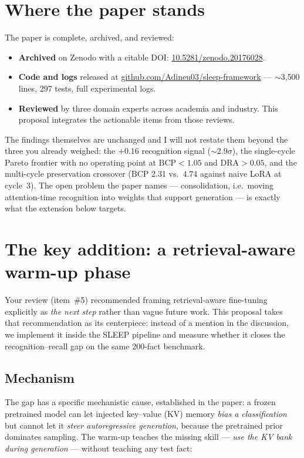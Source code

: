 \documentclass[11pt]{article}
\begin{document}
\section{Where the paper stands}

The paper is complete, archived, and reviewed:

\begin{itemize}
  \item \textbf{Archived} on Zenodo with a citable DOI: \href{https://doi.org/10.5281/zenodo.20176028}{10.5281/zenodo.20176028}.
  \item \textbf{Code and logs} released at \href{https://github.com/Adineu03/sleep-framework}{github.com/Adineu03/sleep-framework} --- $\sim$3{,}500 lines, 297 tests, full experimental logs.
  \item \textbf{Reviewed} by three domain experts across academia and industry. This proposal integrates the actionable items from those reviews.
\end{itemize}

The findings themselves are unchanged and I will not restate them beyond the three you already weighed: the $+0.16$ recognition signal ($\sim$2.9$\sigma$), the single-cycle Pareto frontier with no operating point at $\mathrm{BCP}<1.05$ and $\mathrm{DRA}>0.05$, and the multi-cycle preservation crossover ($\mathrm{BCP}$ 2.31 vs.\ 4.74 against naive LoRA at cycle~3). The open problem the paper names --- consolidation, i.e.\ moving attention-time recognition into weights that support generation --- is exactly what the extension below targets.

\section{The key addition: a retrieval-aware warm-up phase}

Your review (item~\#5) recommended framing retrieval-aware fine-tuning explicitly as \emph{the next step} rather than vague future work. This proposal takes that recommendation as its centerpiece: instead of a mention in the discussion, we implement it inside the SLEEP pipeline and measure whether it closes the recognition--recall gap on the same 200-fact benchmark.

\subsection{Mechanism}
The gap has a specific mechanistic cause, established in the paper: a frozen pretrained model can let injected key--value (KV) memory \emph{bias a classification} but cannot let it \emph{steer autoregressive generation}, because the pretrained prior dominates sampling. The warm-up teaches the missing skill --- \emph{use the KV bank during generation} --- without teaching any test fact:
\end{document}

